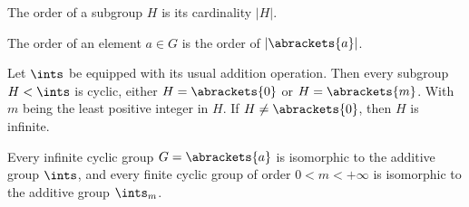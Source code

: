 \documentclass[../main-v2-manifolds.tex]{subfiles}
\begin{document}
\begin{definition}\label{hungerford-chp1:order-subgroup-definition}
    The order of a subgroup $H$ is its cardinality $|H|$.
\end{definition}

\begin{definition}\label{hungerford-chp1:order-element-definition}
    The order of an element $a\in G$ is the order of $|\abrackets{a}|$.
\end{definition}

\begin{wts}\label{hungerford-chp1:theorem3.1}
    Let $\ints$ be equipped with its usual addition operation. Then every subgroup $H<\ints$ is cyclic, either $H=\abrackets{0}$ or $H=\abrackets{m}$. With $m$ being the least positive integer in $H$. If $H\neq\abrackets{0}$, then $H$ is infinite.
\end{wts}
\begin{wts}\label{hungerford-chp1:theorem3.2}
    Every infinite cyclic group $G=\abrackets{a}$ is isomorphic to the additive group $\ints$, and every finite cyclic group of order $0<m<+\infty$ is isomorphic to the additive group $\ints_m$.
\end{wts}
\end{document}

